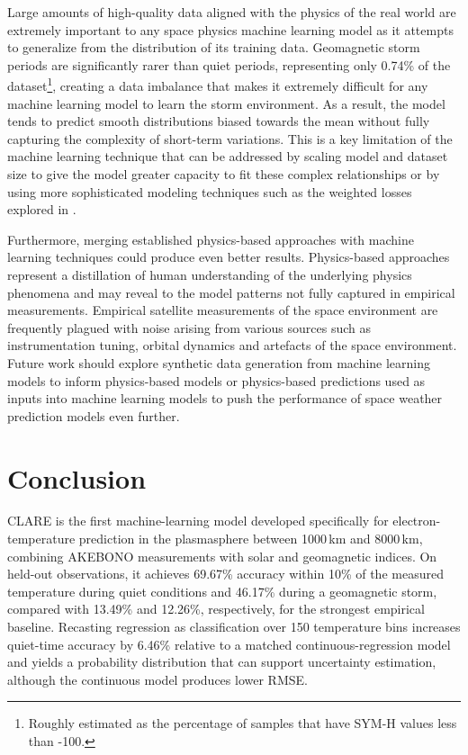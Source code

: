 \documentclass{agujournal2019}
\begin{document}
Large amounts of high-quality data aligned with the physics of the real world are extremely important to any space physics machine learning model as it attempts to generalize from the distribution of its training data. Geomagnetic storm periods are significantly rarer than quiet periods, representing only 0.74\% of the dataset\footnote{Roughly estimated as the percentage of samples that have SYM-H values less than -100.}, creating a data imbalance that makes it extremely difficult for any machine learning model to learn the storm environment. As a result, the model tends to predict smooth distributions biased towards the mean without fully capturing the complexity of short-term variations. This is a key limitation of the machine learning technique that can be addressed by scaling model and dataset size to give the model greater capacity to fit these complex relationships or by using more sophisticated modeling techniques such as the weighted losses explored in \cite{chu_imbalanced_2025}.

Furthermore, merging established physics-based approaches with machine learning techniques could produce even better results. Physics-based approaches represent a distillation of human understanding of the underlying physics phenomena and may reveal to the model patterns not fully captured in empirical measurements. Empirical satellite measurements of the space environment are frequently plagued with noise arising from various sources such as instrumentation tuning, orbital dynamics and artefacts of the space environment. Future work should explore synthetic data generation from machine learning models to inform physics-based models or physics-based predictions used as inputs into machine learning models to push the performance of space weather prediction models even further.

\section{Conclusion}
\label{conclusion}

CLARE is the first machine-learning model developed specifically for electron-temperature prediction in the plasmasphere between 1000\,km and 8000\,km, combining AKEBONO measurements with solar and geomagnetic indices. On held-out observations, it achieves 69.67\% accuracy within 10\% of the measured temperature during quiet conditions and 46.17\% during a geomagnetic storm, compared with 13.49\% and 12.26\%, respectively, for the strongest empirical baseline. Recasting regression as classification over 150 temperature bins increases quiet-time accuracy by 6.46\% relative to a matched continuous-regression model and yields a probability distribution that can support uncertainty estimation, although the continuous model produces lower RMSE.
\end{document}

